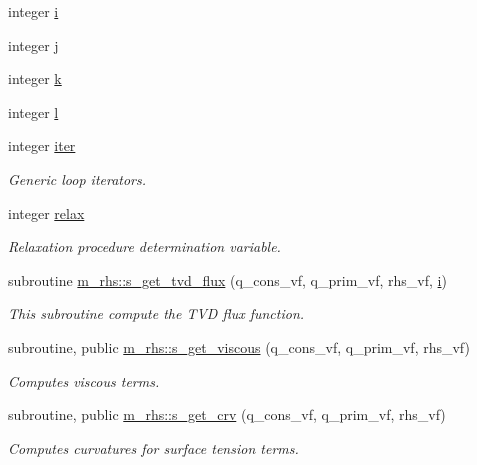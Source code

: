 \begin{DoxyCompactItemize}
\item 
integer \hyperlink{m__rhs_8f90_aaea4baed8fd8b780f6938f0dc1fb0f72}{i}
\item 
integer \hyperlink{m__rhs_8f90_aeadbc0ce9b66517f8fde156199772ec1}{j}
\item 
integer \hyperlink{m__rhs_8f90_af22c486581933c52df7d4aa306382074}{k}
\item 
integer \hyperlink{m__rhs_8f90_a2ac747380de0e6e5e11b01f4137fb75c}{l}
\item 
integer \hyperlink{m__rhs_8f90_ae0579cdf6d579b6ff5e6a5945a99c42c}{iter}
\begin{DoxyCompactList}\small\item\em Generic loop iterators. \end{DoxyCompactList}\item 
integer \hyperlink{m__rhs_8f90_a0048c79fcd5325fffae011dc032b86fb}{relax}
\begin{DoxyCompactList}\small\item\em Relaxation procedure determination variable. \end{DoxyCompactList}\item 
subroutine \hyperlink{namespacem__rhs_a6b6be41d990e9bda7c4830531d7c3470}{m\+\_\+rhs\+::s\+\_\+get\+\_\+tvd\+\_\+flux} (q\+\_\+cons\+\_\+vf, q\+\_\+prim\+\_\+vf, rhs\+\_\+vf, \hyperlink{m__rhs_8f90_aaea4baed8fd8b780f6938f0dc1fb0f72}{i})
\begin{DoxyCompactList}\small\item\em This subroutine compute the T\+VD flux function. \end{DoxyCompactList}\item 
subroutine, public \hyperlink{namespacem__rhs_aac41721bd3275fb997f51c1afaebac4a}{m\+\_\+rhs\+::s\+\_\+get\+\_\+viscous} (q\+\_\+cons\+\_\+vf, q\+\_\+prim\+\_\+vf, rhs\+\_\+vf)
\begin{DoxyCompactList}\small\item\em Computes viscous terms. \end{DoxyCompactList}\item 
subroutine, public \hyperlink{namespacem__rhs_ae70cf6ec305a948efab279a0bf802095}{m\+\_\+rhs\+::s\+\_\+get\+\_\+crv} (q\+\_\+cons\+\_\+vf, q\+\_\+prim\+\_\+vf, rhs\+\_\+vf)
\begin{DoxyCompactList}\small\item\em Computes curvatures for surface tension terms. \end{DoxyCompactList}\item 

\end{DoxyCompactItemize}
